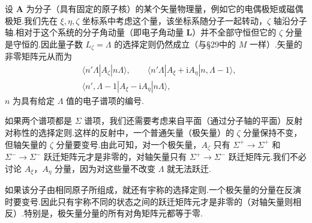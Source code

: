 设 $\boldsymbol{A}$ 为分子（具有固定的原子核）的某个矢量物理量，例如它的电偶极矩或磁偶极矩.我们先在 $\xi,\eta,\zeta$ 坐标系中考虑这个量，该坐标系随分子一起转动，$\zeta$ 轴沿分子轴.相对于这个系统的分子角动量（即电子角动量 $\boldsymbol{L}$）并不全部守恒但它的 $\zeta$ 分量是守恒的.因此量子数 $L_\zeta=\Lambda$ 的选择定则仍然成立（与§29中的 $M$ 一样）.矢量的非零矩阵元从而为
\begin{equation}
\begin{aligned}
  &\langle n'\Lambda|A_\zeta|n\Lambda\rangle,\qquad
  \langle n'\Lambda|A_\xi+\mathrm{i}A_\eta|n,\Lambda-1\rangle,\\
  &\langle n',\Lambda-1|A_\xi-\mathrm{i}A_\eta|n\Lambda\rangle,
\end{aligned}
\end{equation}
$n$ 为具有给定 $\Lambda$ 值的电子谱项的编号.

如果两个谱项都是 $\Sigma$ 谱项，我们还需要考虑来自平面（通过分子轴的平面）反射对称性的选择定则.这样的反射中，一个普通矢量（极矢量）的 $\zeta$ 分量保持不变，但轴矢量的 $\zeta$ 分量要变号.由此可知，对一个极矢量，$A_\zeta$ 只有 $\Sigma^+\to\Sigma^+$ 和 $\Sigma^-\to\Sigma^-$ 跃迁矩阵元才是非零的，对轴矢量只有 $\Sigma^+\to\Sigma^-$ 跃迁矩阵元.我们不必讨论 $A_\xi$，$A_\eta$ 分量，因为对这些量不改变 $\Lambda$ 就无法跃迁.

如果该分子由相同原子所组成，就还有宇称的选择定则.一个极矢量的分量在反演时要变号.因此只有宇称不同的状态之间的跃迁矩阵元才是非零的（对轴矢量则相反）.特别是，极矢量分量的所有对角矩阵元都等于零.

